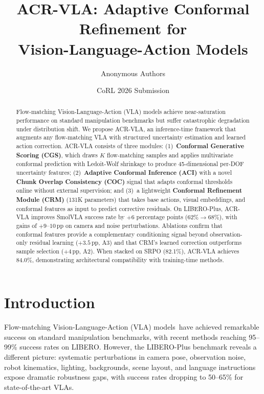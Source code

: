 \documentclass[10pt,twocolumn]{article}
\title{ACR-VLA: Adaptive Conformal Refinement for\\Vision-Language-Action Models}
\author{Anonymous Authors}
\date{CoRL 2026 Submission}
\begin{document}
\maketitle

\begin{abstract}
Flow-matching Vision-Language-Action (VLA) models achieve near-saturation performance on standard manipulation benchmarks but suffer catastrophic degradation under distribution shift.
We propose ACR-VLA, an inference-time framework that augments any flow-matching VLA with structured uncertainty estimation and learned action correction.
ACR-VLA consists of three modules:
(1)~\textbf{Conformal Generative Scoring (CGS)}, which draws $K$ flow-matching samples and applies multivariate conformal prediction with Ledoit-Wolf shrinkage to produce 45-dimensional per-DOF uncertainty features;
(2)~\textbf{Adaptive Conformal Inference (ACI)} with a novel \textbf{Chunk Overlap Consistency (COC)} signal that adapts conformal thresholds online without external supervision;
and (3)~a lightweight \textbf{Conformal Refinement Module (CRM)} (131K parameters) that takes base actions, visual embeddings, and conformal features as input to predict corrective residuals.
On LIBERO-Plus, ACR-VLA improves SmolVLA success rate by $+6$ percentage points (62\%$\to$68\%), with gains of $+9$--$10$\,pp on camera and noise perturbations.
Ablations confirm that conformal features provide a complementary conditioning signal beyond observation-only residual learning ($+3.5$\,pp, A3) and that CRM's learned correction outperforms sample selection ($+4$\,pp, A2).
When stacked on SRPO (82.1\%), ACR-VLA achieves 84.0\%, demonstrating architectural compatibility with training-time methods.
\end{abstract}

\section{Introduction}
\label{sec:intro}

Flow-matching Vision-Language-Action (VLA) models~have achieved remarkable success on standard manipulation benchmarks, with recent methods reaching 95--99\% success rates on LIBERO.
However, the LIBERO-Plus benchmark reveals a different picture: systematic perturbations in camera pose, observation noise, robot kinematics, lighting, backgrounds, scene layout, and language instructions expose dramatic robustness gaps, with success rates dropping to 50--65\% for state-of-the-art VLAs.
\end{document}
